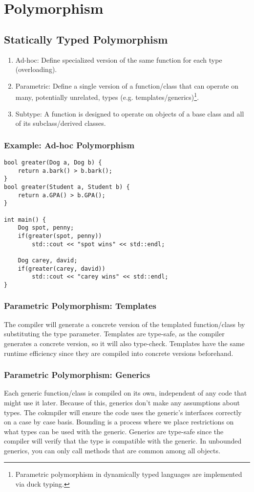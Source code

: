 \documentclass{article}
\begin{document}
\section{Polymorphism}
\subsection{Statically Typed Polymorphism}
\begin{enumerate}[label=(\roman*)]
\item Ad-hoc: Define specialized version of the same function for each
  type (overloading).
\item Parametric: Define a single version of a function/class that can
  operate on many, potentially unrelated, types
  (e.g. templates/generics)\footnote{Parametric polymorphism in
    dynamically typed languages are implemented via duck typing.}.
\item Subtype: A function is designed to operate on objects of a base
  class and all of its subclass/derived classes.
\end{enumerate}

\subsubsection*{Example: Ad-hoc Polymorphism}
\begin{verbatim}
bool greater(Dog a, Dog b) {
    return a.bark() > b.bark();
}
bool greater(Student a, Student b) {
    return a.GPA() > b.GPA();
}

int main() {
    Dog spot, penny;
    if(greater(spot, penny))
        std::cout << "spot wins" << std::endl;

    Dog carey, david;
    if(greater(carey, david))
        std::cout << "carey wins" << std::endl;
}
\end{verbatim}

\subsubsection{Parametric Polymorphism: Templates}
The compiler will generate a concrete version of the templated
function/class by substituting the type parameter. Templates are
type-safe, as the compiler generates a concrete version, so it will
also type-check. Templates have the same runtime efficiency since they
are compiled into concrete versions beforehand.

\subsubsection{Parametric Polymorphism: Generics}
Each generic function/class is compiled on its own, independent of any
code that might use it later. Because of this, generics don't make any
assumptions about types. The cokmpiler will ensure the code uses the
generic's interfaces correctly on a case by case basis. Bounding is a
process where we place restrictions on what types can be used with the
generic. Generics are type-safe since the compiler will verify that
the type is compatible with the generic. In unbounded generics, you
can only call methods that are common among all objects.
\end{document}

